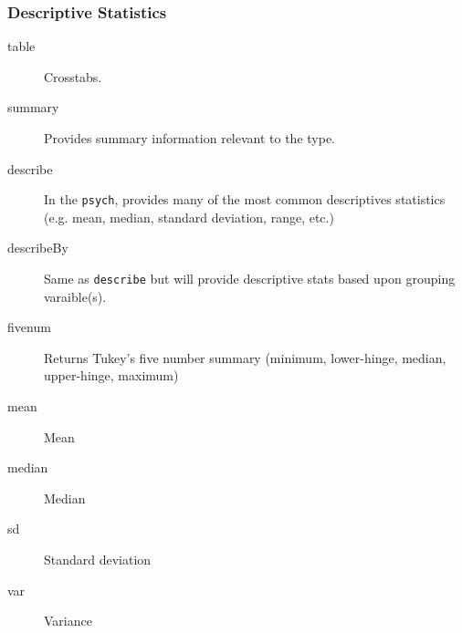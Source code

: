 \documentclass[10pt,slidestop,mathserif,c]{beamer}
\begin{document}
\begin{frame}[fragile]
	\frametitle{Descriptive Statistics}
	\begin{description}
		\item[table] Crosstabs.
		\item[summary] Provides summary information relevant to the type.
		\item[describe] In the \texttt{psych}, provides many of the most common descriptives statistics (e.g. mean, median, standard deviation, range, etc.)
		\item[describeBy] Same as \texttt{describe} but will provide descriptive stats based upon grouping varaible(s).
		\item[fivenum] Returns Tukey's five number summary (minimum, lower-hinge, median, upper-hinge, maximum)
		\item[mean] Mean
		\item[median] Median
		\item[sd] Standard deviation
		\item[var] Variance
	\end{description}

\end{frame}

\end{document}
